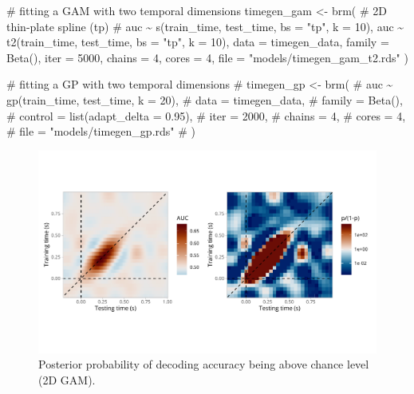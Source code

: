 \documentclass[
  doc,
  floatsintext,
  longtable,
  a4paper,
  nolmodern,
  notxfonts,
  notimes,
  colorlinks=true,linkcolor=blue,citecolor=blue,urlcolor=blue]{apa7}
\newenvironment{Shaded}{\begin{snugshade}}{\end{snugshade}}
\newcommand{\AttributeTok}[1]{\textcolor[rgb]{0.40,0.45,0.13}{#1}}
\newcommand{\CommentTok}[1]{\textcolor[rgb]{0.37,0.37,0.37}{#1}}
\newcommand{\DecValTok}[1]{\textcolor[rgb]{0.68,0.00,0.00}{#1}}
\newcommand{\FunctionTok}[1]{\textcolor[rgb]{0.28,0.35,0.67}{#1}}
\newcommand{\NormalTok}[1]{\textcolor[rgb]{0.00,0.23,0.31}{#1}}
\newcommand{\OtherTok}[1]{\textcolor[rgb]{0.00,0.23,0.31}{#1}}
\newcommand{\SpecialCharTok}[1]{\textcolor[rgb]{0.37,0.37,0.37}{#1}}
\newcommand{\StringTok}[1]{\textcolor[rgb]{0.13,0.47,0.30}{#1}}
\begin{document}
\begin{Shaded}
\begin{Highlighting}[]
\CommentTok{\# fitting a GAM with two temporal dimensions}
\NormalTok{timegen\_gam }\OtherTok{\textless{}{-}} \FunctionTok{brm}\NormalTok{(}
    \CommentTok{\# 2D thin{-}plate spline (tp)}
    \CommentTok{\# auc \textasciitilde{} s(train\_time, test\_time, bs = "tp", k = 10),}
\NormalTok{    auc }\SpecialCharTok{\textasciitilde{}} \FunctionTok{t2}\NormalTok{(train\_time, test\_time, }\AttributeTok{bs =} \StringTok{"tp"}\NormalTok{, }\AttributeTok{k =} \DecValTok{10}\NormalTok{),}
    \AttributeTok{data =}\NormalTok{ timegen\_data,}
    \AttributeTok{family =} \FunctionTok{Beta}\NormalTok{(),}
    \AttributeTok{iter =} \DecValTok{5000}\NormalTok{,}
    \AttributeTok{chains =} \DecValTok{4}\NormalTok{,}
    \AttributeTok{cores =} \DecValTok{4}\NormalTok{,}
    \AttributeTok{file =} \StringTok{"models/timegen\_gam\_t2.rds"}
\NormalTok{    )}

\CommentTok{\# fitting a GP with two temporal dimensions}
\CommentTok{\# timegen\_gp \textless{}{-} brm(}
\CommentTok{\#     auc \textasciitilde{} gp(train\_time, test\_time, k = 20),}
\CommentTok{\#     data = timegen\_data,}
\CommentTok{\#     family = Beta(),}
\CommentTok{\#     control = list(adapt\_delta = 0.95),}
\CommentTok{\#     iter = 2000,}
\CommentTok{\#     chains = 4,}
\CommentTok{\#     cores = 4,}
\CommentTok{\#     file = "models/timegen\_gp.rds"}
\CommentTok{\#     )}
\end{Highlighting}
\end{Shaded}

\begin{figure}[H]

\caption{Posterior probability of decoding accuracy being above chance
level (2D GAM).}

{\centering \includegraphics[width=1\textwidth,height=\textheight]{brms_meeg_files/figure-pdf/gam-timegen-post-preds-1.pdf}

}

\end{figure}%
\end{document}
